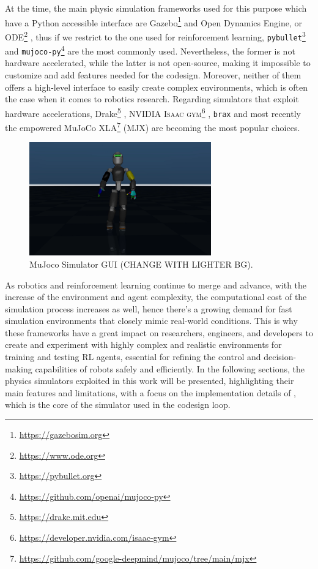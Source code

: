 At the time, the main physic simulation frameworks used for this purpose which have a Python accessible interface are Gazebo\footnote{\url{https://gazebosim.org}} \citep{Koenig2004} and Open Dynamics Engine, or ODE\footnote{\url{https://www.ode.org}}\citep{ode:2008} \citep{erez_simulation_2015,ivaldi:hal-01116148}, thus if we restrict to the one used for reinforcement learning, \texttt{pybullet}\footnote{\url{https://pybullet.org}}\citep{coumans_pybullet_2016} and \texttt{mujoco-py}\footnote{\url{https://github.com/openai/mujoco-py}}\citep{todorov_mujoco_2012} are the most commonly used. Nevertheless, the former is not hardware accelerated, while the latter is not open-source, making it impossible to customize and add features needed for the codesign. Moreover, neither of them offers a high-level interface to easily create complex environments, which is often the case when it comes to robotics research.
Regarding simulators that exploit hardware accelerations, Drake\footnote{\url{https://drake.mit.edu}}
\citep{drake}, NVIDIA \textsc{Isaac gym}\footnote{\url{https://developer.nvidia.com/isaac-gym}} \citep{makoviychuk_isaac_2021}, \texttt{brax} \citep{freeman_brax_2021} and most recently the \jax empowered MuJoCo XLA\footnote{\url{https://github.com/google-deepmind/mujoco/tree/main/mjx}} (MJX) are becoming the most popular choices.

\begin{figure}
    \centering
    \caption{MuJoco Simulator GUI (CHANGE WITH LIGHTER BG).}
    \label{fig:mujoco}
    \includegraphics[width=0.7\textwidth]{Images/mujoco_ergocub.png}
\end{figure}

As robotics and reinforcement learning continue to merge and advance, with the increase of the environment and agent complexity, the computational cost of the simulation process increases as well, hence there's a growing demand for fast simulation environments that closely mimic real-world conditions. This is why these frameworks have a great impact on researchers, engineers, and developers to create and experiment with highly complex and realistic environments for training and testing \ac{RL} agents, essential for refining the control and decision-making capabilities of robots safely and efficiently. In the following sections, the physics simulators exploited in this work will be presented, highlighting their main features and limitations, with a focus on the implementation details of \jax, which is the core of the simulator used in the codesign loop.

